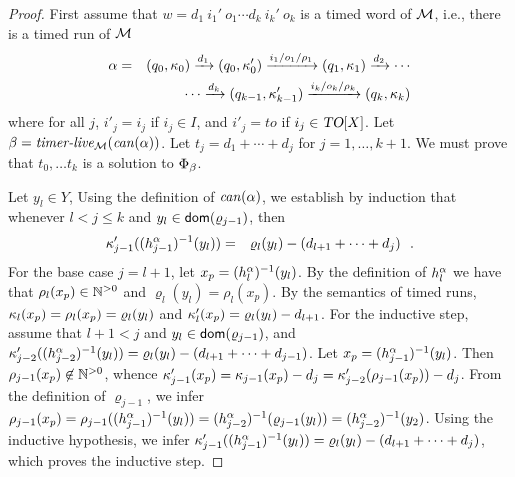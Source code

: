 \begin{proof}
First assume that
$w =  d_1 ~ i_1' ~ o_1  \cdots d_k ~ i_k' ~ o_k$
is a timed word of ${\mathcal M}$, i.e., there is a timed run of ${\mathcal M}$
\begin{eqnarray*}
\alpha & = & (q_0,\kappa_0) \xrightarrow{d_1} (q_0,\kappa_0') \xrightarrow{i_1/o_1/\rho_1} (q_1,\kappa_1) \xrightarrow{d_2} 
\cdots
\\ && \qquad \cdots
\xrightarrow{d_k} (q_{k-1},\kappa_{k-1}') \xrightarrow{i_k/o_k/\rho_k} (q_k,\kappa_k)
\end{eqnarray*}
where for all  $j$,
$i'_j   =   i_j$ if $i_j \in I$, and
$i'_j   = \mathit{to}$ if $i_j \in \mbox{\sl TO}[X]$.
Let $\beta = \mbox{\it timer-live}_{{\mathcal M}}({\mathit{can}({\alpha})})$.
Let $t_j = d_1 + \cdots + d_j$ for $j = 1 , \ldots, k+1$.
We must prove that $t_0, \ldots t_k$ is a solution to $\Phi_{\beta}$.

Let $y_l \in Y$,
Using the definition of $\mathit{can}({\alpha})$, we establish by induction that 
 whenever $l < j \leq k$ and
 $y_l \in {\textsf{dom}}(\varrho_{j-1})$, then
\begin{eqnarray*}
 \kappa_{j-1}'((h_{j-1}^{\alpha})^{-1}(y_l)) & = &
 \varrho_l(y_l) - (d_{l+1} + \cdots + d_j)
 \ \ .
\end{eqnarray*}
 For the base case $j = l+1$, let $x_p = (h_{l}^{\alpha})^{-1}(y_l)$.
 By the definition of $h_{l}^{\alpha}$ we have that
 $\rho_l(x_p)  \in {\mathbb N}^{>0}$ and  
 $\varrho_l(y_l) = \rho_l(x_p)$. By the semantics of timed runs,
 $\kappa_l(x_p) =  \rho_l(x_p) = \varrho_l(y_l)$ and
 $\kappa_l'(x_p) =  \varrho_l(y_l) - d_{l+1}$.
 For the inductive step, assume that $l+1 < j$ and 
 $y_l \in {\textsf{dom}}(\varrho_{j-1})$, and
 $\kappa_{j-2}'((h_{j-2}^{\alpha})^{-1}(y_l)) =
 \varrho_l(y_l) - (d_{l+1} + \cdots + d_{j-1})$.
 Let $x_p = (h_{j-1}^{\alpha})^{-1}(y_l)$.
 Then $\rho_{j-1}(x_p) \not\in {\mathbb N}^{>0}$, whence
 $\kappa_{j-1}'(x_p) =  \kappa_{j-1}(x_p) -d_j = 
 \kappa_{j-2}'(\rho_{j-1}(x_p)) - d_j$.
 From the definition of $\varrho_{j-1}$, we infer
 $\rho_{j-1}(x_p) = \rho_{j-1}((h_{j-1}^{\alpha})^{-1}(y_l)) =
 (h_{j-2}^{\alpha})^{-1}(\varrho_{j-1}(y_l)) =
 (h_{j-2}^{\alpha})^{-1}(y_2)$. Using the inductive hypothesis, we infer
 $\kappa_{j-1}'((h_{j-1}^{\alpha})^{-1}(y_l)) =
 \varrho_l(y_l) - (d_{l+1} + \cdots + d_j)$, which proves the inductive
 step.


\end{proof}
